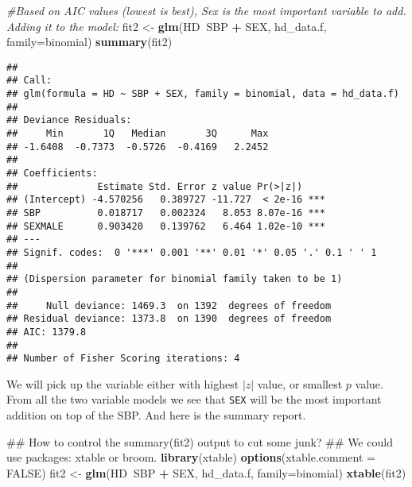 \documentclass[]{article}
\newenvironment{Shaded}{\begin{snugshade}}{\end{snugshade}}
\newcommand{\KeywordTok}[1]{\textcolor[rgb]{0.13,0.29,0.53}{\textbf{#1}}}
\newcommand{\DataTypeTok}[1]{\textcolor[rgb]{0.13,0.29,0.53}{#1}}
\newcommand{\StringTok}[1]{\textcolor[rgb]{0.31,0.60,0.02}{#1}}
\newcommand{\CommentTok}[1]{\textcolor[rgb]{0.56,0.35,0.01}{\textit{#1}}}
\newcommand{\OtherTok}[1]{\textcolor[rgb]{0.56,0.35,0.01}{#1}}
\newcommand{\OperatorTok}[1]{\textcolor[rgb]{0.81,0.36,0.00}{\textbf{#1}}}
\newcommand{\NormalTok}[1]{#1}
\begin{document}
\begin{Shaded}
\begin{Highlighting}[]
\CommentTok{#Based on AIC values (lowest is best), Sex is the most important variable to add. Adding it to the model:}
\NormalTok{fit2 <-}\StringTok{ }\KeywordTok{glm}\NormalTok{(HD}\OperatorTok{~}\NormalTok{SBP }\OperatorTok{+}\StringTok{ }\NormalTok{SEX, hd_data.f, }\DataTypeTok{family=}\NormalTok{binomial)}
\KeywordTok{summary}\NormalTok{(fit2)}
\end{Highlighting}
\end{Shaded}

\begin{verbatim}
## 
## Call:
## glm(formula = HD ~ SBP + SEX, family = binomial, data = hd_data.f)
## 
## Deviance Residuals: 
##     Min       1Q   Median       3Q      Max  
## -1.6408  -0.7373  -0.5726  -0.4169   2.2452  
## 
## Coefficients:
##              Estimate Std. Error z value Pr(>|z|)    
## (Intercept) -4.570256   0.389727 -11.727  < 2e-16 ***
## SBP          0.018717   0.002324   8.053 8.07e-16 ***
## SEXMALE      0.903420   0.139762   6.464 1.02e-10 ***
## ---
## Signif. codes:  0 '***' 0.001 '**' 0.01 '*' 0.05 '.' 0.1 ' ' 1
## 
## (Dispersion parameter for binomial family taken to be 1)
## 
##     Null deviance: 1469.3  on 1392  degrees of freedom
## Residual deviance: 1373.8  on 1390  degrees of freedom
## AIC: 1379.8
## 
## Number of Fisher Scoring iterations: 4
\end{verbatim}

We will pick up the variable either with highest \(|z|\) value, or
smallest \(p\) value. From all the two variable models we see that
\texttt{SEX} will be the most important addition on top of the SBP. And
here is the summary report.

\begin{Shaded}
\begin{Highlighting}[]
\NormalTok{## How to control the summary(fit2) output to cut some junk?}
\NormalTok{## We could use packages: xtable or broom. }
\KeywordTok{library}\NormalTok{(xtable)}
\KeywordTok{options}\NormalTok{(}\DataTypeTok{xtable.comment =} \OtherTok{FALSE}\NormalTok{)}
\NormalTok{fit2 <-}\StringTok{ }\KeywordTok{glm}\NormalTok{(HD}\OperatorTok{~}\NormalTok{SBP }\OperatorTok{+}\StringTok{ }\NormalTok{SEX, hd_data.f, }\DataTypeTok{family=}\NormalTok{binomial)}
\KeywordTok{xtable}\NormalTok{(fit2)}
\end{Highlighting}
\end{Shaded}
\end{document}
